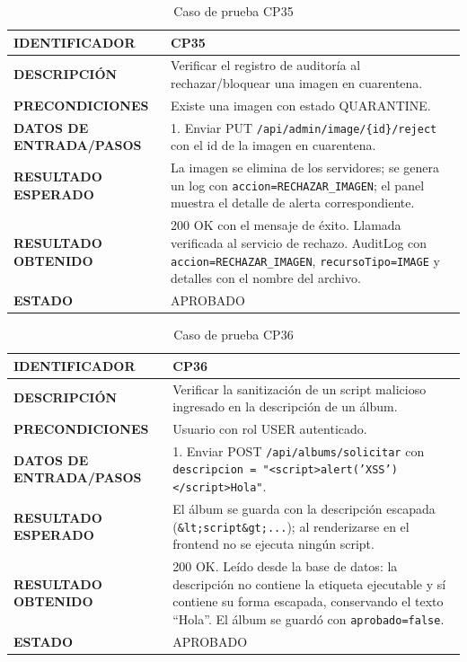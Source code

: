 \begin{table}[H]
\centering
\caption{Caso de prueba CP35}
\begin{tabular}{|p{3.5cm}|p{10.3cm}|}
\hline
\textbf{IDENTIFICADOR} & CP35 \\
\hline
\textbf{DESCRIPCIÓN} & Verificar el registro de auditoría al rechazar/bloquear una imagen en cuarentena. \\
\hline
\textbf{PRECONDICIONES} & Existe una imagen con estado QUARANTINE. \\
\hline
\textbf{DATOS DE ENTRADA/PASOS} & 1. Enviar PUT \texttt{/api/admin/image/\{id\}/reject} con el id de la imagen en cuarentena. \\
\hline
\textbf{RESULTADO ESPERADO} & La imagen se elimina de los servidores; se genera un log con \texttt{accion=RECHAZAR\_IMAGEN}; el panel muestra el detalle de alerta correspondiente. \\
\hline
\textbf{RESULTADO OBTENIDO} & 200 OK con el mensaje de éxito. Llamada verificada al servicio de rechazo. AuditLog con \texttt{accion=RECHAZAR\_IMAGEN}, \texttt{recursoTipo=IMAGE} y detalles con el nombre del archivo. \\
\hline
\textbf{ESTADO} & APROBADO \\
\hline
\end{tabular}
\end{table}

\begin{table}[H]
\centering
\caption{Caso de prueba CP36}
\begin{tabular}{|p{3.5cm}|p{10.3cm}|}
\hline
\textbf{IDENTIFICADOR} & CP36 \\
\hline
\textbf{DESCRIPCIÓN} & Verificar la sanitización de un script malicioso ingresado en la descripción de un álbum. \\
\hline
\textbf{PRECONDICIONES} & Usuario con rol USER autenticado. \\
\hline
\textbf{DATOS DE ENTRADA/PASOS} & 1. Enviar POST \texttt{/api/albums/solicitar} con \texttt{descripcion = "\textless script\textgreater alert('XSS')\textless /script\textgreater Hola"}. \\
\hline
\textbf{RESULTADO ESPERADO} & El álbum se guarda con la descripción escapada (\texttt{\&lt;script\&gt;...}); al renderizarse en el frontend no se ejecuta ningún script. \\
\hline
\textbf{RESULTADO OBTENIDO} & 200 OK. Leído desde la base de datos: la descripción no contiene la etiqueta ejecutable y sí contiene su forma escapada, conservando el texto ``Hola''. El álbum se guardó con \texttt{aprobado=false}. \\
\hline
\textbf{ESTADO} & APROBADO \\
\hline
\end{tabular}
\end{table}

